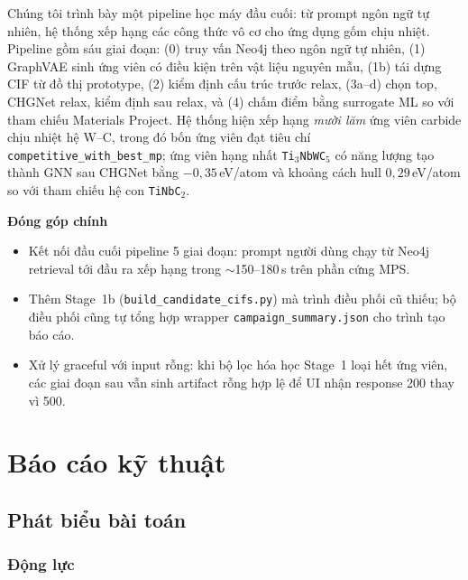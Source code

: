 \documentclass[11pt,a4paper]{report}
\newcommand{\eV}{eV/atom}
\begin{document}
Chúng tôi trình bày một pipeline học máy đầu cuối: từ prompt ngôn ngữ tự nhiên, hệ thống
xếp hạng các công thức vô cơ cho ứng dụng gốm chịu nhiệt. Pipeline gồm sáu giai đoạn:
(0) truy vấn Neo4j theo ngôn ngữ tự nhiên, (1) GraphVAE sinh ứng viên có điều kiện trên vật
liệu nguyên mẫu, (1b) tái dựng CIF từ đồ thị prototype, (2) kiểm định cấu trúc trước relax,
(3a--d) chọn top, CHGNet relax, kiểm định sau relax, và (4) chấm điểm bằng surrogate ML so
với tham chiếu Materials Project. Hệ thống hiện xếp hạng \textit{mười lăm} ứng viên carbide
chịu nhiệt hệ W--C, trong đó bốn ứng viên đạt tiêu chí \texttt{competitive\_with\_best\_mp};
ứng viên hạng nhất \texttt{Ti$_3$NbWC$_5$} có năng lượng tạo thành GNN sau CHGNet bằng
$-0{,}35$\,\eV{} và khoảng cách hull $0{,}29$\,\eV{} so với tham chiếu hệ con
\texttt{TiNbC$_2$}.

\vspace{0.5em}
\noindent\textbf{Đóng góp chính}
\begin{itemize}[leftmargin=*,itemsep=2pt]
\item Kết nối đầu cuối pipeline 5 giai đoạn: prompt người dùng chạy từ Neo4j retrieval tới
      đầu ra xếp hạng trong $\sim$150--180\,s trên phần cứng MPS.
\item Thêm Stage~1b (\texttt{build\_candidate\_cifs.py}) mà trình điều phối cũ thiếu; bộ
      điều phối cũng tự tổng hợp wrapper \texttt{campaign\_summary.json} cho trình tạo
      báo cáo.
\item Xử lý graceful với input rỗng: khi bộ lọc hóa học Stage~1 loại hết ứng viên, các giai
      đoạn sau vẫn sinh artifact rỗng hợp lệ để UI nhận response 200 thay vì 500.
\end{itemize}

\part{Báo cáo kỹ thuật}

\chapter{Phát biểu bài toán}

\section{Động lực}
\end{document}

